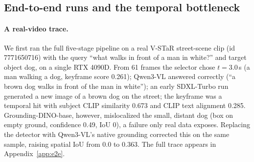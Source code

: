 \subsection{End-to-end runs and the temporal bottleneck}\label{sec:exp-e2e}

\paragraph{A real-video trace.}
We first ran the full five-stage pipeline on a real V-STaR street-scene clip (id 7771650716) with the query ``what walks in front of a man in white?'' and target object dog, on a single RTX 4090D. From 61 frames the selector chose $t=3.0$\,s (a man walking a dog, keyframe score 0.261); Qwen3-VL answered correctly (``a brown dog walks in front of the man in white''); an early SDXL-Turbo run generated a new image of a brown dog on the street; the keyframe was a temporal hit with subject CLIP similarity 0.673 and CLIP text alignment 0.285. Grounding-DINO-base, however, mislocalized the small, distant dog (box on empty ground, confidence 0.49, IoU 0), a failure only real data exposes. Replacing the detector with Qwen3-VL's native grounding corrected this on the same sample, raising spatial IoU from 0.0 to 0.363. The full trace appears in Appendix~\ref{app:e2e}.

